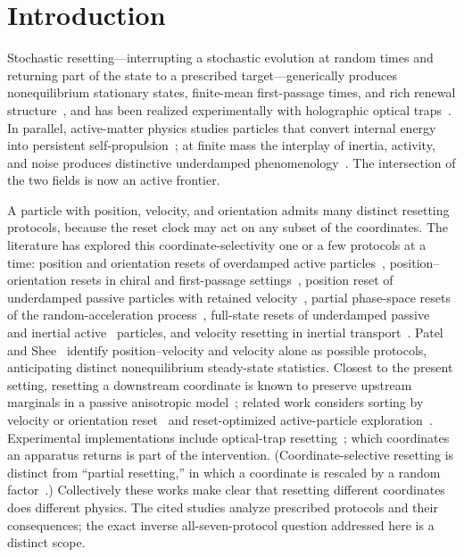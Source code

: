 \section{Introduction}\label{introduction}

Stochastic resetting---interrupting a stochastic evolution at random times and returning part of the state to a prescribed target---generically produces nonequilibrium stationary states, finite-mean first-passage times, and rich renewal structure~\cite{EvansMajumdar2011,EvansMajumdarSchehr2020}, and has been realized experimentally with holographic optical traps~\cite{TalFriedman2020,Besga2020}. In parallel, active-matter physics studies particles that convert internal energy into persistent self-propulsion~\cite{Romanczuk2012,Marchetti2013,Bechinger2016}; at finite mass the interplay of inertia, activity, and noise produces distinctive underdamped phenomenology~\cite{Lowen2020}. The intersection of the two fields is now an active frontier.

A particle with position, velocity, and orientation admits many distinct resetting protocols, because the reset clock may act on any subset of the coordinates. The literature has explored this coordinate-selectivity one or a few protocols at a time: position and orientation resets of overdamped active particles~\cite{KumarSadekarBasu,GhoshMandalChaki,Baouche}, position--orientation resets in chiral and first-passage settings~\cite{Shee,BaoucheKurzthaler2025}, position reset of underdamped passive particles with retained velocity~\cite{Gupta}, partial phase-space resets of the random-acceleration process~\cite{Singh2020,CapalaDybiec2021}, full-state resets of underdamped passive~\cite{FrankeSokolov2026} and inertial active~\cite{PatelShee} particles, and velocity resetting in inertial transport~\cite{OlsenLowen,Howlader2026}. Patel and Shee~\cite{PatelShee} identify position--velocity and velocity alone as possible protocols, anticipating distinct nonequilibrium steady-state statistics. Closest to the present setting, resetting a downstream coordinate is known to preserve upstream marginals in a passive anisotropic model~\cite{ChakiOlsenLowen}; related work considers sorting by velocity or orientation reset~\cite{CleurenEichhorn2026} and reset-optimized active-particle exploration~\cite{OlsenLowenCaprini2026}. Experimental implementations include optical-trap resetting~\cite{TalFriedman2020,Besga2020}; which coordinates an apparatus returns is part of the intervention. (Coordinate-selective resetting is distinct from ``partial resetting,'' in which a coordinate is rescaled by a random factor~\cite{TalFriedmanPartial2022}.) Collectively these works make clear that resetting different coordinates does different physics. The cited studies analyze prescribed protocols and their consequences; the exact inverse all-seven-protocol question addressed here is a distinct scope.

